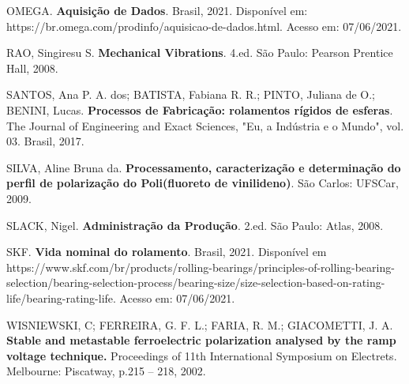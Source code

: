 \documentclass[
	12pt,				
	oneside,			
	a4paper,			
	english,			
	brazil,			
	]{abntex2ppgsi}
\begin{document}
\begin{thebibliography}{9}
 OMEGA.
  \textbf{Aquisição de Dados}.
  Brasil, 2021. Disponível em: https://br.omega.com/prodinfo/aquisicao-de-dados.html. Acesso em: 07/06/2021.

 RAO, Singiresu S.
  \textbf{Mechanical Vibrations}.
  4.ed. São Paulo: Pearson Prentice Hall, 2008.

    SANTOS, Ana P. A. dos; BATISTA, Fabiana R. R.; PINTO, Juliana de O.; BENINI, Lucas.
  \textbf{Processos de Fabricação: rolamentos rígidos de esferas}.
  The Journal of Engineering and Exact Sciences, "Eu, a Indústria e o Mundo", vol. 03. Brasil, 2017.  
  
    SILVA, Aline Bruna da.
  \textbf{Processamento, caracterização e determinação do perfil de polarização do Poli(fluoreto de vinilideno)}.
  São Carlos: UFSCar, 2009.

 SLACK, Nigel.
  \textbf{Administração da Produção}.
  2.ed. São Paulo: Atlas, 2008.
  
 SKF.
  \textbf{Vida nominal do rolamento}.
  Brasil, 2021. Disponível em https://www.skf.com/br/products/rolling-bearings/principles-of-rolling-bearing-selection/bearing-selection-process/bearing-size/size-selection-based-on-rating-life/bearing-rating-life. Acesso em: 07/06/2021.

    WISNIEWSKI, C; FERREIRA, G. F. L.; FARIA, R. M.; GIACOMETTI, J. A.
  \textbf{Stable and metastable ferroelectric polarization analysed by the ramp voltage technique.}
  Proceedings of 11th International Symposium on Electrets. Melbourne: Piscatway, p.215 – 218, 2002.


\end{thebibliography}


%
%






\begin{anexosenv}


\end{anexosenv}
\end{document}
